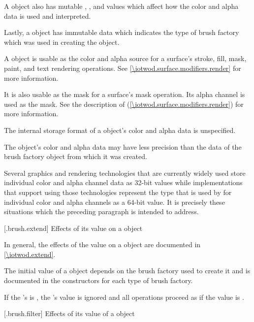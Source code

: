\pnum
A  object also has mutable , , and  values which affect how the color and alpha data is used and interpreted.

\pnum
Lastly, a  object has immutable  data which indicates the type of brush factory which was used in creating the  object.

\pnum
A  object is usable as the color and alpha source for a surface's stroke, fill, mask, paint, and text rendering operations. See \ref{\iotwod.surface.modifiers.render} for more information.

\pnum
It is also usable as the mask for a surface's mask operation. Its alpha channel is used as the mask. See the description of  (\ref{\iotwod.surface.modifiers.render}) for more information.

\pnum
The internal storage format of a  object's color and alpha data is unspecified.

\pnum
The  object's color and alpha data may have less precision than the data of the brush factory object from which it was created.

\pnum
\enterexample
Several graphics and rendering technologies that are currently widely used store individual color and alpha channel data as 32-bit  values while \Cpp implementations that support using those technologies represent the  type that is used by  for individual color and alpha channels as a 64-bit value. It is precisely these situations which the preceding paragraph is intended to address.
\exitexample

 [\iotwod.brush.extend] {Effects of its  value on a  object}

\pnum
In general, the effects of the  value on a  object are documented in \ref{\iotwod.extend}.

\pnum
The initial  value of a  object depends on the brush factory used to create it and is documented in the  constructors for each type of brush factory.

\pnum
If the 's  is , the 's  value is ignored and all operations proceed as if the  value is .

 [\iotwod.brush.filter] {Effects of its  value of a  object}

